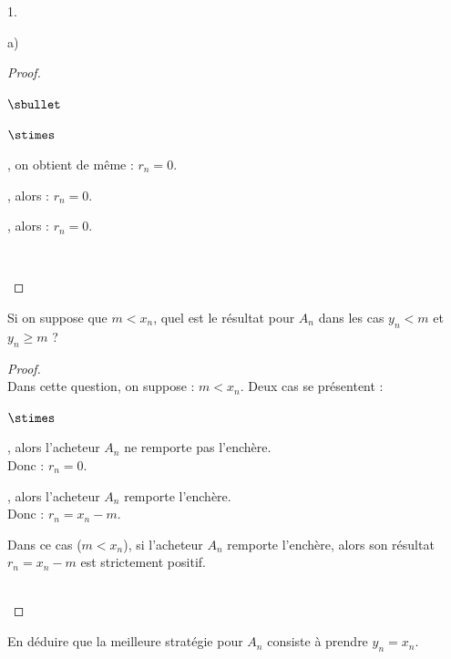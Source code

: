 \begin{noliste}{1.}
\begin{noliste}{a)}
\begin{proof}
\begin{noliste}{$\sbullet$}
\begin{noliste}{$\stimes$}
	  \item {}, on obtient de même : $r_n=0$.
	  
	  \item {}, alors : $r_n=0$.
	  
	  \item {}, alors : $r_n=0$.
	\end{noliste}
	~\\[-1.4cm]
      \end{noliste}
    \end{proof}

    
    \item Si on suppose que $m < x_n$, quel est le résultat pour $A_n$
    dans les cas $y_n < m$ et $y_n \geq m$ ?
    
    \begin{proof}~\\
      Dans cette question, on suppose : $m < x_n$. Deux cas se 
      présentent :
      \begin{noliste}{$\stimes$}
	\item {}, alors l'acheteur $A_n$ ne 
	remporte pas l'enchère. \\
	Donc : $r_n=0$.
	
	\item {}, alors l'acheteur $A_n$
	remporte l'enchère.\\
	Donc : $r_n= x_n-m$.
      \end{noliste}
      
      \begin{remarkL}{.95}
        Dans ce cas ($m<x_n$), si l'acheteur $A_n$ remporte l'enchère,
        alors son résultat $r_n=x_n-m$ est strictement positif.
      \end{remarkL}~\\[-1.4cm]
    \end{proof}

    
    \newpage
    
    
    \item En déduire que la meilleure stratégie pour $A_n$ consiste 
    à prendre $y_n =x_n$.
    

\end{noliste}
\end{noliste}
